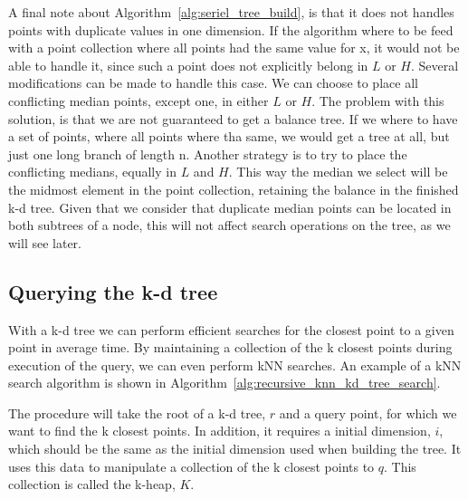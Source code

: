 A final note about Algorithm~\ref{alg:seriel_tree_build}, is that it does not handles points with duplicate values in one dimension. If the algorithm where to be feed with a point collection where all points had the same value for x, it would not be able to handle it, since such a point does not explicitly belong in $L$ or $H$. Several modifications can be made to handle this case. We can choose to place all conflicting median points, except one, in either $L$ or $H$. The problem with this solution, is that we are not guaranteed to get a balance tree. If we where to have a set of points, where all points where tha same, we would get a tree at all, but just one long branch of length n. Another strategy is to try to place the conflicting medians, equally in $L$ and $H$. This way the median we select will be the midmost element in the point collection, retaining the balance in the finished k-d tree. Given that we consider that duplicate median points can be located in both subtrees of a node, this will not affect search operations on the tree, as we will see later.

\subsection{Querying the k-d tree}  %
\label{sub:querying_the_k_d_tree} 

With a k-d tree we can perform efficient searches for the closest point to a given point in  average time\cite{Friedman:1977}. By maintaining a collection of the k closest points during execution of the query, we can even perform kNN searches. An example of a kNN search algorithm is shown in Algorithm~\ref{alg:recursive_knn_kd_tree_search}.


The procedure will take the root of a k-d tree, $r$ and a query point, for which we want to find the k closest points. In addition, it requires a initial dimension, $i$, which should be the same as the initial dimension used when building the tree. It uses this data to manipulate a collection of the k closest points to $q$. This collection is called the k-heap, $K$.

